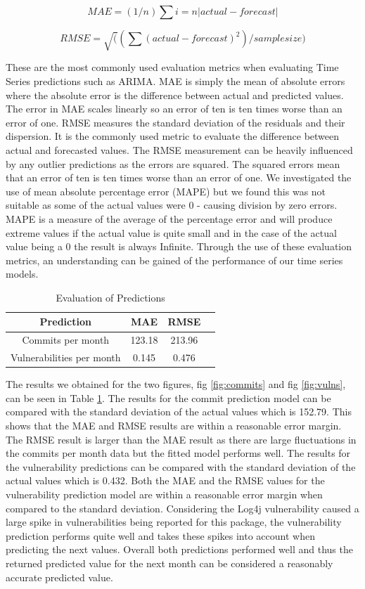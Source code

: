 \documentclass[conference]{IEEEtran}
\begin{document}
\[ MAE = (1/n) \sum{i=n} |actual - forecast| \]

\[ RMSE = \sqrt( (\sum (actual - forecast) ^ 2) / sample size )  \]

These are the most commonly used evaluation metrics when evaluating Time Series predictions such as ARIMA. MAE is simply the mean of absolute errors where the absolute error is the difference between actual and predicted values. The error in MAE scales linearly so an error of ten is ten times worse than an error of one. RMSE measures the standard deviation of the residuals and their dispersion. It is the commonly used metric to evaluate the difference between actual and forecasted values. The RMSE measurement can be heavily influenced by any outlier predictions \cite{f_abdulhafidh_dael_performance_2022} as the errors are squared. The squared errors mean that an error of ten is ten times worse than an error of one. We investigated the use of mean absolute percentage error (MAPE) but we found this was not suitable as some of the actual values were 0 - causing division by zero errors. MAPE is a measure of the average of the percentage error and will produce extreme values if the actual value is quite small and in the case of the actual value being a 0 the result is always Infinite. Through the use of these evaluation metrics, an understanding can be gained of the performance of our time series models. 

\begin{table}
 \caption{Evaluation of Predictions}
\label{evaluations}
\begin{center}
\begin{tabular}{|c|c|c|c|}
\hline
    \textbf{Prediction} & \textbf{MAE} & \textbf{RMSE} \\ \hline
    Commits per month & 123.18 & 213.96 \\ \hline
    Vulnerabilities per month & 0.145 & 0.476 \\ \hline
\end{tabular}
\end{center}
\end{table}

The results we obtained for the two figures, fig \ref{fig:commits} and fig \ref{fig:vulns}, can be seen in Table \ref{evaluations}. The results for the commit prediction model can be compared with the standard deviation of the actual values which is 152.79. This shows that the MAE and RMSE results are within a reasonable error margin. The RMSE result is larger than the MAE result as there are large fluctuations in the commits per month data but the fitted model performs well. The results for the vulnerability predictions can be compared with the standard deviation of the actual values which is 0.432. Both the MAE and the RMSE values for the vulnerability prediction model are within a reasonable error margin when compared to the standard deviation. Considering the Log4j vulnerability caused a large spike in vulnerabilities being reported for this package, the vulnerability prediction performs quite well and takes these spikes into account when predicting the next values. Overall both predictions performed well and thus the returned predicted value for the next month can be considered a reasonably accurate predicted value.
\end{document}

